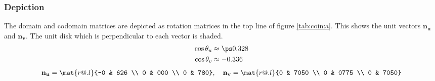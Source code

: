 \subsubsection{Depiction}
The domain and codomain matrices are depicted as rotation matrices in the top line of figure \eqref{tab:coin:a}. This shows the unit vectors $\mathbf{n_{u}}$ and $\mathbf{n_{v}}$. The unit disk which is perpendicular to each vector is shaded.
\begin{equation}
  \begin{split}
    \cos \theta_{u} &\approx \ps 0.328 \\
    \cos \theta_{v} &\approx -0.336
  \end{split}
\end{equation}
%
\begin{equation}
  \begin{split}
    \mathbf{n_{u}} = \mat{r@{.}l}{-0 & 626 \\ 0 & 000 \\ 0 & 780}, \quad \mathbf{n_{v}} = \mat{r@{.}l}{0 & 7050 \\ 0 & 0775 \\ 0 & 7050}
  \end{split}
\end{equation}

\endinput